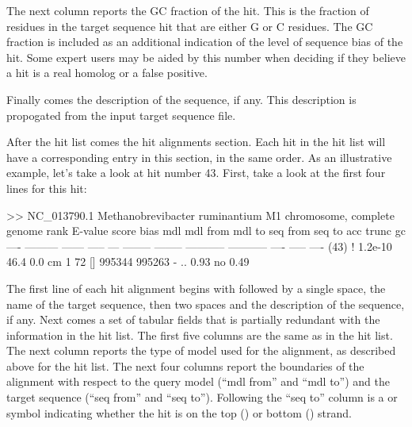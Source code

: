 The next column reports the GC fraction of the hit. This is the
fraction of residues in the target sequence hit that are either G or C
residues. The GC fraction is included as an additional indication of
the level of sequence bias of the hit. Some expert users may be aided
by this number when deciding if they believe a hit is a real homolog
or a false positive.

Finally comes the description of the sequence, if any. This
description is propogated from the input target sequence file.

After the hit list comes the hit alignments section. Each hit in 
the hit list will have a corresponding entry in this section, in the
same order. As an illustrative example, let's take a look at
hit number 43. First, take a look at the first four lines for this
hit: 

\begin{sreoutput}
>> NC_013790.1  Methanobrevibacter ruminantium M1 chromosome, complete genome
 rank     E-value  score  bias mdl mdl from   mdl to       seq from      seq to       acc trunc   gc
 ----   --------- ------ ----- --- -------- --------    ----------- -----------      ---- ----- ----
 (43) !   1.2e-10   46.4   0.0  cm        1       72 []      995344      995263 - .. 0.93    no 0.49
\end{sreoutput}

The first line of each hit alignment begins with \otext{>>} followed
by a single space, the name of the target sequence, then two spaces
and the description of the sequence, if any. Next comes a set of
tabular fields that is partially redundant with the information in the
hit list. The first five columns are the same as in the hit list. The
next column reports the type of model used for the alignment, as
described above for the hit list. The next four columns report the
boundaries of the alignment with respect to the query model (``mdl
from'' and ``mdl to'') and the target sequence (``seq from'' and ``seq
to''). Following the ``seq to'' column is a \otext{+} or \otext{-}
symbol indicating whether the hit is on the top (\otext{+}) or bottom
(\otext{-}) strand.


